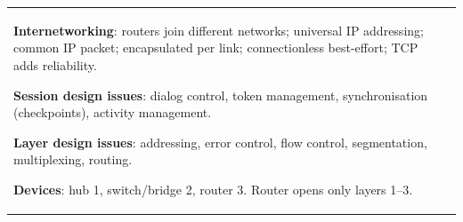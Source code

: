 \documentclass[10pt]{article}
\begin{document}
\begin{cheatsheet}
\begin{tabularx}{\linewidth}{@{}XX@{}}
\textbf{Internetworking}: routers join different networks; universal IP addressing; common IP packet; encapsulated per link; connectionless best-effort; TCP adds reliability.

\textbf{Session design issues}: dialog control, token management, synchronisation (checkpoints), activity management.

\textbf{Layer design issues}: addressing, error control, flow control, segmentation, multiplexing, routing.

\textbf{Devices}: hub 1, switch/bridge 2, router 3. Router opens only layers 1--3.
\end{tabularx}
\end{cheatsheet}
\end{document}
